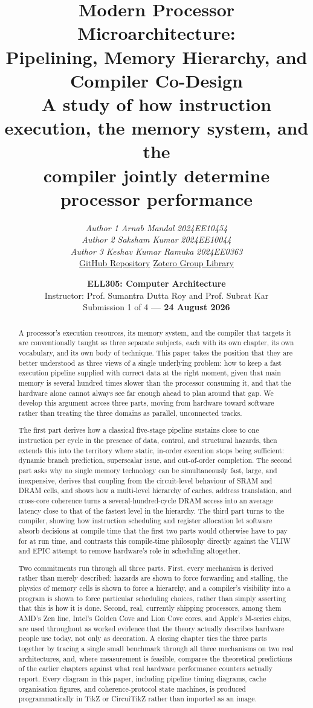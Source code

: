 \documentclass[11pt,a4paper]{report}
\title{\textbf{Modern Processor Microarchitecture:\\[4pt]
\Large Pipelining, Memory Hierarchy, and\\ Compiler Co-Design}\\[10pt]
\large A study of how instruction execution, the memory system, and the\\
compiler jointly determine processor performance}
\author{
\textit{Author 1 Arnab Mandal} \quad \textit{2024EE10454} \\
\textit{Author 2 Saksham Kumar} \quad \textit{2024EE10044} \\
\textit{Author 3 Keshav Kumar Ramuka} \quad \textit{2024EE0363} \\[8pt]
\href{https://github.com/arnabmandal-5090/Computer-Architecture-Term-Paper---Modern-Processor-Microarchitecture/new/main}{GitHub Repository}
\quad\textbar\quad
\href{https://www.zotero.org/groups/6645711/term_paper_references_67}{Zotero Group Library}
}
\date{
\textbf{ELL305: Computer Architecture}\\
Instructor: Prof. Sumantra Dutta Roy and Prof. Subrat Kar\\[6pt]
Submission 1 of 4 \textbf{--- 24 August 2026}
}
\begin{document}
\maketitle

\begin{abstract}
\noindent
A processor's execution resources, its memory system, and the compiler
that targets it are conventionally taught as three separate subjects,
each with its own chapter, its own vocabulary, and its own body of
technique. This paper takes the position that they are better understood
as three views of a single underlying problem: how to keep a fast
execution pipeline supplied with correct data at the right moment, given
that main memory is several hundred times slower than the processor
consuming it, and that the hardware alone cannot always see far enough
ahead to plan around that gap. We develop this argument across three
parts, moving from hardware toward software rather than treating the
three domains as parallel, unconnected tracks.

The first part derives how a classical five-stage pipeline sustains
close to one instruction per cycle in the presence of data, control, and
structural hazards, then extends this into the territory where static,
in-order execution stops being sufficient: dynamic branch prediction,
superscalar issue, and out-of-order completion. The second part asks why
no single memory technology can be simultaneously fast, large, and
inexpensive, derives that coupling from the circuit-level behaviour of
SRAM and DRAM cells, and shows how a multi-level hierarchy of caches,
address translation, and cross-core coherence turns a several-hundred-cycle
DRAM access into an average latency close to that of the fastest level
in the hierarchy. The third part turns to the compiler, showing how
instruction scheduling and register allocation let software absorb
decisions at compile time that the first two parts would otherwise have
to pay for at run time, and contrasts this compile-time philosophy
directly against the VLIW and EPIC attempt to remove hardware's role in
scheduling altogether.

Two commitments run through all three parts. First, every mechanism is
derived rather than merely described: hazards are shown to force
forwarding and stalling, the physics of memory cells is shown to force
a hierarchy, and a compiler's visibility into a program is shown to
force particular scheduling choices, rather than simply asserting that
this is how it is done. Second, real, currently shipping processors,
among them AMD's Zen line, Intel's Golden Cove and Lion Cove cores, and
Apple's M-series chips, are used throughout as worked evidence that the
theory actually describes hardware people use today, not only as
decoration. A closing chapter ties the three parts together by tracing a
single small benchmark through all three mechanisms on two real
architectures, and, where measurement is feasible, compares the
theoretical predictions of the earlier chapters against what real
hardware performance counters actually report. Every diagram in this
paper, including pipeline timing diagrams, cache organisation figures,
and coherence-protocol state machines, is produced programmatically in
TikZ or CircuiTikZ rather than imported as an image.


\end{abstract}
\end{document}
